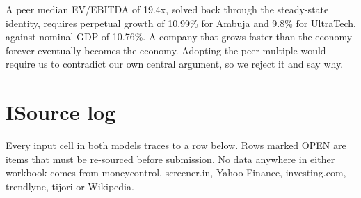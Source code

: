 \begin{minipage}[t]{0.40\textwidth}
\vspace{2.5mm}
\begin{warnbox}
A peer median EV/EBITDA of 19.4x, solved back through the steady-state identity,
requires perpetual growth of 10.99\% for Ambuja and 9.8\% for UltraTech, against
nominal GDP of 10.76\%. A company that grows faster than the economy forever
eventually becomes the economy. Adopting the peer multiple would require us to
contradict our own central argument, so we reject it and say why.
\end{warnbox}
\end{minipage}
\clearpage

\section*{I\quad Source log}

Every input cell in both models traces to a row below. Rows marked OPEN are items that
must be re-sourced before submission. No data anywhere in either workbook comes from
moneycontrol, screener.in, Yahoo Finance, investing.com, trendlyne, tijori or
Wikipedia.

